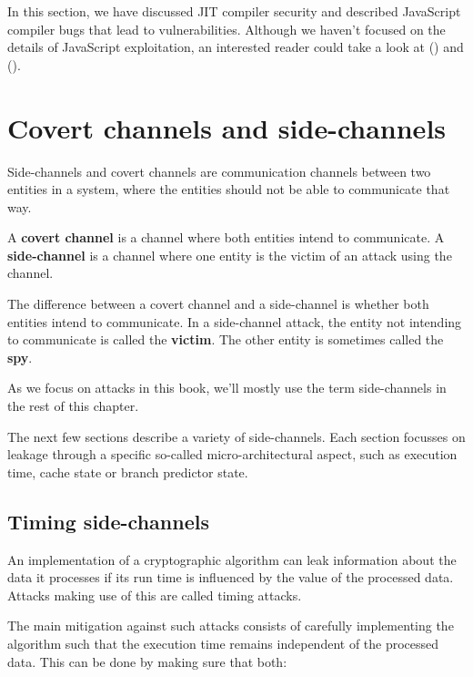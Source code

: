 \documentclass[
  a4paper,
]{report}
\begin{document}
In this section, we have discussed JIT compiler security and described
JavaScript compiler bugs that lead to vulnerabilities. Although we
haven't focused on the details of JavaScript exploitation, an interested
reader could take a look at () and
().

\chapter{Covert channels and
side-channels}\label{covert-channels-and-side-channels}

Side-channels and covert channels are communication channels between two
entities in a system, where the entities should not be able to
communicate that way.

A \textbf{covert channel} is a channel where both
entities intend to communicate. A
\textbf{side-channel} is a channel where one entity
is the victim of an attack using the channel.

The difference between a covert channel and a side-channel is whether
both entities intend to communicate. In a side-channel attack, the
entity not intending to communicate is called the
\textbf{victim}. The other entity is sometimes called the
\textbf{spy}.

As we focus on attacks in this book, we'll mostly use the term
side-channels in the rest of this chapter.

The next few sections describe a variety of side-channels. Each section
focusses on leakage through a specific so-called micro-architectural
aspect, such as execution time, cache state
or branch predictor state.

\section{Timing side-channels}\label{timing-side-channels}

An implementation of a cryptographic algorithm can leak information
about the data it processes if its run time is influenced by the value
of the processed data. Attacks making use of this are called timing
attacks.

The main mitigation against such attacks consists of carefully
implementing the algorithm such that the execution time remains
independent of the processed data. This can be done by making sure that
both:
\end{document}
